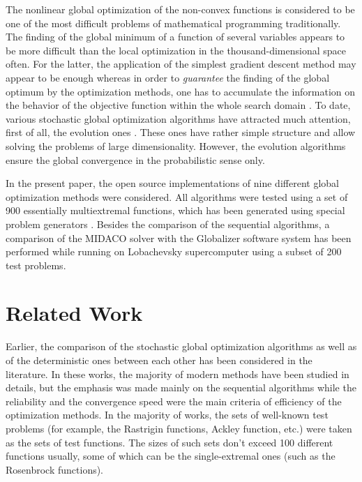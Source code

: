 \documentclass{svproc}
\begin{document}
The nonlinear global optimization of the non-convex functions is considered to be one of the most
difficult problems of mathematical programming traditionally. The finding of the global minimum of
a function of several variables appears to be more difficult than the local optimization in the
thousand-dimensional space often. For the latter, the application of the simplest gradient descent
method may appear to be enough whereas in order to \textit{guarantee} the finding of the global
optimum by the optimization methods, one has to accumulate the information on the behavior of the
objective function within the whole search domain
\cite{Jones2009,Paulavicius2011,Evtushenko2013,strSergGO}. To date, various stochastic global
optimization algorithms have attracted much attention, first of all, the evolution ones
\cite{Storn1997, SCHLUTER2009, KennedyEberhart1995}. These ones have rather simple structure
and allow solving the problems of large dimensionality. However, the evolution algorithms ensure
the global convergence in the probabilistic sense only.

In the present paper, the open source implementations of nine different global optimization methods
were considered. All algorithms were tested using a set of 900 essentially multiextremal functions,
which has been generated using special problem generators \cite{Gaviano2003, grishaginClass}.
Besides the comparison of the sequential algorithms, a comparison of the MIDACO solver
\cite{Schlueter2012} with the Globalizer software system \cite{globalizerSystem,Strongin2018} has been
performed while running on Lobachevsky supercomputer using a subset of 200 test problems.


\section{Related Work}

Earlier, the comparison of the stochastic global optimization algorithms \cite{Ali2005, JSSv060i06}
as well as of the deterministic ones \cite{posik2012, KVASOV2018245, Liberti2005} between each
other has been considered in the literature. In these works, the majority of modern methods have
been studied in details, but the emphasis was made mainly on the sequential algorithms while the
reliability and the convergence speed were the main criteria of efficiency of the optimization
methods. In the majority of works, the sets of well-known test problems (for example, the Rastrigin
functions, Ackley function, etc.) were taken as the sets of test functions. The sizes of such sets don't
exceed 100 different functions usually, some of which can be the single-extremal ones (such as the
Rosenbrock functions).
\end{document}
